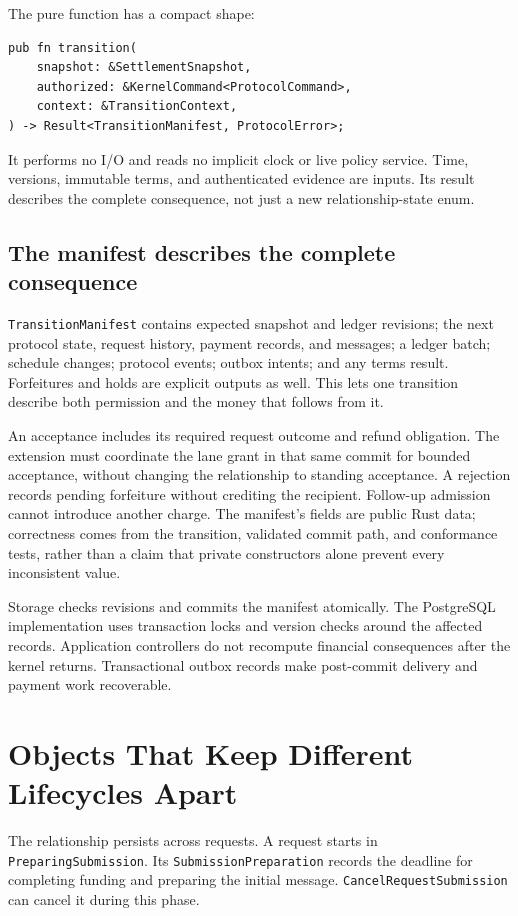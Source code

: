 \documentclass[11pt]{article}
\begin{document}
The pure function has a compact shape:
\begin{lstlisting}
pub fn transition(
    snapshot: &SettlementSnapshot,
    authorized: &KernelCommand<ProtocolCommand>,
    context: &TransitionContext,
) -> Result<TransitionManifest, ProtocolError>;
\end{lstlisting}
It performs no I/O and reads no implicit clock or live policy service. Time,
versions, immutable terms, and authenticated evidence are inputs. Its result
describes the complete consequence, not just a new relationship-state enum.

\subsection{The manifest describes the complete consequence}

\texttt{TransitionManifest} contains expected snapshot and ledger revisions;
the next protocol state, request history, payment records, and messages;
a ledger batch; schedule changes; protocol events; outbox intents; and any terms
result. Forfeitures and holds are explicit outputs as well. This lets one
transition describe both permission and the money that follows from it.

An acceptance includes its required request outcome and refund obligation.
The extension must coordinate the lane grant in that same commit for bounded
acceptance, without changing the relationship to standing acceptance.
A rejection records pending forfeiture without crediting the recipient.
Follow-up admission cannot introduce another charge. The manifest's fields are
public Rust data; correctness comes from the transition, validated commit path,
and conformance tests, rather than a claim that private constructors alone
prevent every inconsistent value.

Storage checks revisions and commits the manifest atomically. The PostgreSQL
implementation uses transaction locks and version checks around the affected
records. Application controllers do not recompute financial consequences after
the kernel returns. Transactional outbox records make post-commit delivery and
payment work recoverable.

\section{Objects That Keep Different Lifecycles Apart}

The relationship persists across requests. A request starts in
\texttt{PreparingSubmission}. Its \texttt{SubmissionPreparation} records the
deadline for completing funding and preparing the initial message.
\texttt{CancelRequestSubmission} can cancel it during this phase.
\end{document}
